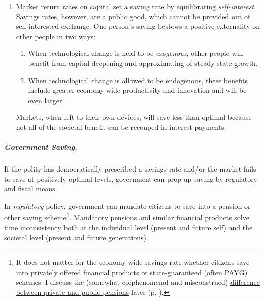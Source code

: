 \begin{enumerate}
	\item Market return rates on capital set a saving rate by equilibrating \emph{self-interest}. Savings rates, however, are a public good, which cannot be provided out of self-interested exchange. One person's saving  bestows a positive externality on other people in two ways:

	\begin{enumerate} 
		\item When technological change is held to be \emph{exogenous}, other people will benefit from capital deepening and approximating of steady-state growth. 
		\item When technological change is allowed to be endogenous, these benefits include greater economy-wide productivity and innovation and will be even larger. 
	\end{enumerate} 
	
	Markets, when left to their own devices, will save less than optimal because not all of the societal benefit can be recouped in interest payments. %
\end{enumerate}

\subparagraph{Government Saving.}  \label{sec:governmentsaves} If the polity has democratically prescribed a savings rate and/or the market fails to save at positively optimal levels, government can prop up saving by regulatory and fiscal means. 

In \emph{regulatory} policy, government can mandate citizens to save into a pension or other saving scheme\footnote{
	It does not matter for the economy-wide savings rate whether citizens save into privately offered financial products or state-guaranteed (often \gls{PAYG}) schemes. I discuss the (somewhat epiphenomenal and misconstrued) \hyperref[sec:pensions]{difference between private and public pensions} later (p. \pageref{sec:pensions}).}. 
Mandatory pensions and similar financial products solve time inconsistency both at the individual level (present and future self) and the societal level (present and future generations). 

